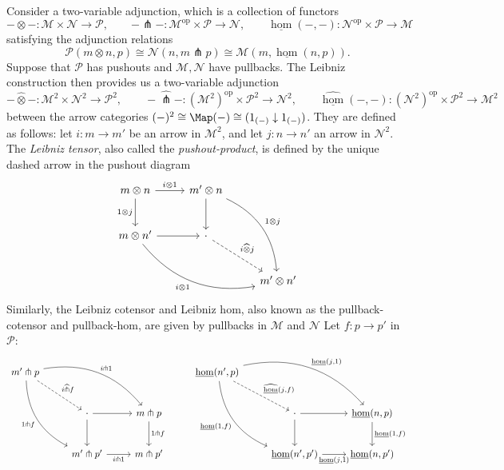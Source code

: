  \begin{construction}[Leibniz]\label{2.1.6}
 	Consider a two-variable adjunction, which is a collection of functors
	\[
		-\otimes -: \mathcal{M} \times \mathcal{N}  \to \mathcal{P} ,\qquad -\pitchfork- : \mathcal{M} ^{\mathrm{op}} \times \mathcal{P}  \to \mathcal{N} ,\qquad \underline{\operatorname{hom}} (-,-) : \mathcal{N} ^{\mathrm{op}} \times \mathcal{P}  \to \mathcal{M} 
	\]
	satisfying the adjunction relations
	\[
		\mathcal{P} (m\otimes n,p)\cong \mathcal{N} (n, m\pitchfork p )\cong \mathcal{M} (m,\underline{\operatorname{hom} } (n,p))
	.\]
	Suppose that $\mathcal{P} $ has pushouts and $\mathcal{M} ,\mathcal{N} $ have pullbacks. The Leibniz construction then provides us a two-variable adjunction
	\[
		-\widehat{\otimes }-: \mathcal{M} ^2\times \mathcal{N} ^2 \to \mathcal{P} ^2,\qquad -\widehat{\pitchfork}-: \left( \mathcal{M} ^2 \right) ^{\mathrm{op}} \times \mathcal{P} ^2 \to \mathcal{N} ^2,\qquad \widehat{\underline{\operatorname{hom} } }(-,-): \left( \mathcal{N} ^{2}  \right) ^{\mathrm{op}} \times \mathcal{P} ^2 \to \mathcal{M} ^2
	\]
	between the arrow categories $(-)^2\cong \Map (-)\cong (1_{(-)} \downarrow 1_{(-)} )$. They are defined as follows: let $i : m \to m'$ be an arrow in $\mathcal{M} ^2$, and let $j : n \to n'$ an arrow in $\mathcal{N} ^2$. The \emph{Leibniz tensor}, also called the \emph{pushout-product}, is defined by the unique dashed arrow in the pushout diagram
	\[\begin{tikzcd}[row sep = 2.5em, column sep = 2.5em]
	m\otimes n \ar[" i\otimes 1 ", r] \ar[" 1\otimes j "', d]  & m'\otimes n \ar[" 1\otimes j ", bend left, ddr] \ar[d] &  \\
	m\otimes n' \ar[r] \ar[" i\otimes 1 "', bend right, drr]  & \cdot \ar[" i\widehat{\otimes }j ", dashed, dr]  &  \\
	 &  & m'\otimes n'
	\end{tikzcd}\]
	Similarly, the Leibniz cotensor and Leibniz hom, also known as the pullback-cotensor and pullback-hom, are given by pullbacks in $\mathcal{M} $ and $\mathcal{N} $ Let $f : p \to p'$ in $\mathcal{P} $:
	\[\begin{tikzcd}[row sep = 2.5em, column sep = 2.5em]
		m'\pitchfork p \ar[" i\pitchfork 1 ", bend left, drr] \ar[" 1\pitchfork f "', bend right, ddr] \ar[" i\widehat{\pitchfork}f ", dashed, dr]  &  &  & \underline{\operatorname{hom} }(n',p)\ar[" \widehat{\underline{\operatorname{hom} } }(j\text{,} f) ", dashed, dr] \ar[" \underline{\operatorname{hom} } (j\text{,} 1) ", bend left, drr] \ar[" \underline{\operatorname{hom} } (1\text{,} f) "', bend right, ddr]  &  &  \\
	 & \cdot \ar[r] \ar[d]  & m\pitchfork p \ar[" 1\pitchfork f ", d] &  & \cdot \ar[r] \ar[d]  & \underline{\operatorname{hom} } (n,p)\ar[" \underline{\operatorname{hom} } (1\text{,} f) ", d]  \\
	 & m'\pitchfork p' \ar[" i\pitchfork 1 "', r]  & m\pitchfork p' &  & \underline{\operatorname{hom} } (n',p')\ar[" \underline{\operatorname{hom} } (j\text{,} 1) "', r]  & \underline{\operatorname{hom} } (n,p')
	\end{tikzcd}\]
\end{construction}

